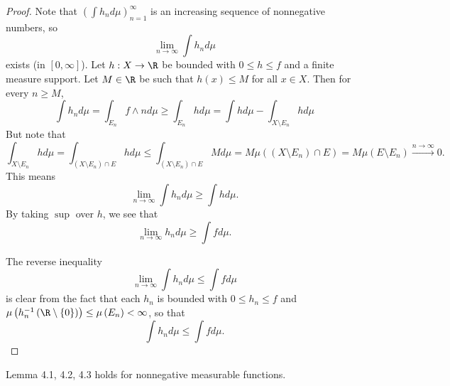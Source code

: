 \documentclass[stat901]{subfiles}
\begin{document}
    \begin{proof}
        Note that $\left( \int h_{n}d\mu \right)^{\infty}_{n=1}$ is an increasing sequence of nonnegative numbers, so
        \begin{equation*}
            \lim_{n\to\infty} \int h_nd\mu
        \end{equation*}
        exists (in $\left[ 0,\infty \right]$). Let $h:X\to\R$ be bounded with $0\leq h\leq f$ and a finite measure support. Let $M\in\R$ be such that $h\left( x \right)\leq M$ for all $x\in X$. Then for every $n\geq M$,
        \begin{equation*}
            \int h_nd\mu = \int_{E_n} f\wedge nd\mu \geq \int_{E_n} hd\mu = \int hd\mu - \int_{X\setminus E_n} hd\mu
        \end{equation*}
        But note that
        \begin{equation*}
            \int_{X\setminus E_n}hd\mu = \int_{\left( X\setminus E_n \right)\cap E}hd\mu \leq \int_{\left( X\setminus E_n \right)\cap E}Md\mu = M\mu\left( \left( X\setminus E_n \right)\cap E \right) = M\mu\left( E\setminus E_n \right) \overset{n\to\infty}{\to} 0 .
        \end{equation*}
        This means
        \begin{equation*}
            \lim_{n\to\infty} \int h_nd\mu \geq \int hd\mu.
        \end{equation*}
        By taking $\sup$ over $h$, we see that
        \begin{equation*}
            \lim_{n\to\infty}h_nd\mu \geq \int fd\mu.
        \end{equation*}

        The reverse inequality
        \begin{equation*}
            \lim_{n\to\infty}\int h_nd\mu \leq \int fd\mu
        \end{equation*}
        is clear from the fact that each $h_n$ is bounded with $0\leq h_n\leq f$ and $\mu\left( h_n^{-1}\left( \R\setminus \left\lbrace 0 \right\rbrace \right) \right) \leq \mu\left( E_n \right) < \infty$, so that
        \begin{equation*}
            \int h_nd\mu \leq \int fd\mu.
        \end{equation*}
    \end{proof}

    \clearpage

    \begin{lemma}{}
        Lemma 4.1, 4.2, 4.3 holds for nonnegative measurable functions.
    \end{lemma}
\end{document}
